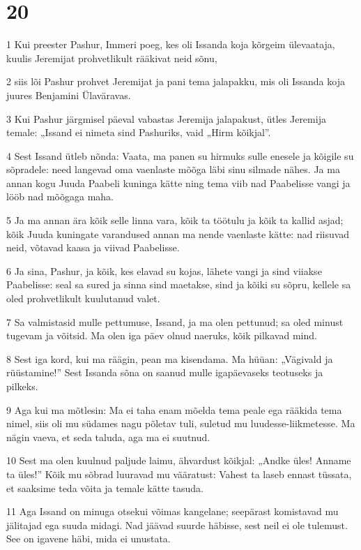 \chapter{20}

\par 1 Kui preester Pashur, Immeri poeg, kes oli Issanda koja kõrgeim ülevaataja, kuulis Jeremijat prohvetlikult rääkivat neid sõnu,
\par 2 siis lõi Pashur prohvet Jeremijat ja pani tema jalapakku, mis oli Issanda koja juures Benjamini Ülaväravas.
\par 3 Kui Pashur järgmisel päeval vabastas Jeremija jalapakust, ütles Jeremija temale: „Issand ei nimeta sind Pashuriks, vaid „Hirm kõikjal”.
\par 4 Sest Issand ütleb nõnda: Vaata, ma panen su hirmuks sulle enesele ja kõigile su sõpradele: need langevad oma vaenlaste mõõga läbi sinu silmade nähes. Ja ma annan kogu Juuda Paabeli kuninga kätte ning tema viib nad Paabelisse vangi ja lööb nad mõõgaga maha.
\par 5 Ja ma annan ära kõik selle linna vara, kõik ta töötulu ja kõik ta kallid asjad; kõik Juuda kuningate varandused annan ma nende vaenlaste kätte: nad riisuvad neid, võtavad kaasa ja viivad Paabelisse.
\par 6 Ja sina, Pashur, ja kõik, kes elavad su kojas, lähete vangi ja sind viiakse Paabelisse: seal sa sured ja sinna sind maetakse, sind ja kõiki su sõpru, kellele sa oled prohvetlikult kuulutanud valet.
\par 7 Sa valmistasid mulle pettumuse, Issand, ja ma olen pettunud; sa oled minust tugevam ja võitsid. Ma olen iga päev olnud naeruks, kõik pilkavad mind.
\par 8 Sest iga kord, kui ma räägin, pean ma kisendama. Ma hüüan: „Vägivald ja rüüstamine!” Sest Issanda sõna on saanud mulle igapäevaseks teotuseks ja pilkeks.
\par 9 Aga kui ma mõtlesin: Ma ei taha enam mõelda tema peale ega rääkida tema nimel, siis oli mu südames nagu põletav tuli, suletud mu luudesse-liikmetesse. Ma nägin vaeva, et seda taluda, aga ma ei suutnud.
\par 10 Sest ma olen kuulnud paljude laimu, ähvardust kõikjal: „Andke üles! Anname ta üles!” Kõik mu sõbrad luuravad mu vääratust: Vahest ta laseb ennast tüssata, et saaksime teda võita ja temale kätte tasuda.
\par 11 Aga Issand on minuga otsekui võimas kangelane; seepärast komistavad mu jälitajad ega suuda midagi. Nad jäävad suurde häbisse, sest neil ei ole tulemust. See on igavene häbi, mida ei unustata.
